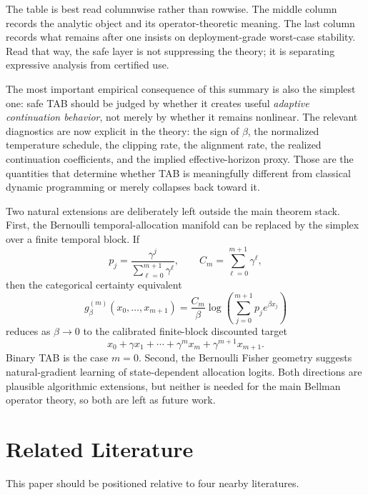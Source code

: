\documentclass{article}
\theoremstyle{remark}
\begin{document}
The table is best read columnwise rather than rowwise. The middle column records the analytic object and its operator-theoretic meaning. The last column records what remains after one insists on deployment-grade worst-case stability. Read that way, the safe layer is not suppressing the theory; it is separating expressive analysis from certified use.

The most important empirical consequence of this summary is also the simplest one: safe TAB should be judged by whether it creates useful \emph{adaptive continuation behavior}, not merely by whether it remains nonlinear. The relevant diagnostics are now explicit in the theory: the sign of $\beta$, the normalized temperature schedule, the clipping rate, the alignment rate, the realized continuation coefficients, and the implied effective-horizon proxy. Those are the quantities that determine whether TAB is meaningfully different from classical dynamic programming or merely collapses back toward it.

Two natural extensions are deliberately left outside the main theorem stack. First, the Bernoulli temporal-allocation manifold can be replaced by the simplex over a finite temporal block. If
\[
p_j=\frac{\gamma^j}{\sum_{\ell=0}^{m+1}\gamma^\ell},
\qquad
C_m=\sum_{\ell=0}^{m+1}\gamma^\ell,
\]
then the categorical certainty equivalent
\[
g^{(m)}_\beta(x_0,\dots,x_{m+1})
=
\frac{C_m}{\beta}
\log\left(\sum_{j=0}^{m+1}p_j e^{\beta x_j}\right)
\]
reduces as $\beta\to 0$ to the calibrated finite-block discounted target
\[
x_0+\gamma x_1+\cdots+\gamma^m x_m+\gamma^{m+1}x_{m+1}.
\]
Binary TAB is the case $m=0$. Second, the Bernoulli Fisher geometry suggests natural-gradient learning of state-dependent allocation logits. Both directions are plausible algorithmic extensions, but neither is needed for the main Bellman operator theory, so both are left as future work.

\section{Related Literature}
\label{sec:related}

This paper should be positioned relative to four nearby literatures.
\end{document}
